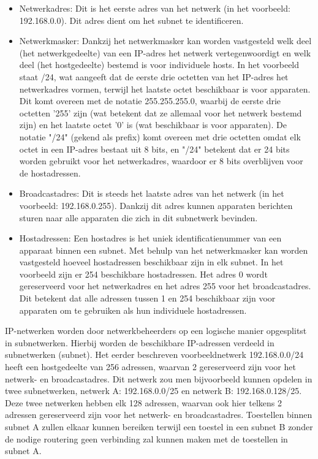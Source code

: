 \begin{itemize}
    \item Netwerkadres: Dit is het eerste adres van het netwerk (in het voorbeeld: 192.168.0.0). Dit adres dient om het subnet te identificeren.
    \item Netwerkmasker: Dankzij het netwerkmasker kan worden vastgesteld welk deel (het netwerkgedeelte) van een IP-adres het netwerk vertegenwoordigt en welk deel (het hostgedeelte) bestemd is voor individuele hosts. In het voorbeeld staat /24, wat aangeeft dat de eerste drie octetten van het IP-adres het netwerkadres vormen, terwijl het laatste octet beschikbaar is voor apparaten. Dit komt overeen met de notatie 255.255.255.0, waarbij de eerste drie octetten '255' zijn (wat betekent dat ze allemaal voor het netwerk bestemd zijn) en het laatste octet '0' is (wat beschikbaar is voor apparaten). De notatie "/24" (gekend als prefix) komt overeen met drie octetten omdat elk octet in een IP-adres bestaat uit 8 bits, en "/24" betekent dat er 24 bits worden gebruikt voor het netwerkadres, waardoor er 8 bits overblijven voor de hostadressen.      
    \item Broadcastadres: Dit is steeds het laatste adres van het netwerk (in het voorbeeld: 192.168.0.255). Dankzij dit adres kunnen apparaten berichten sturen naar alle apparaten die zich in dit subnetwerk bevinden.
    \item Hostadressen: Een hostadres is het uniek identificatienummer van een apparaat binnen een subnet. Met behulp van het netwerkmasker kan worden vastgesteld hoeveel hostadressen beschikbaar zijn in elk subnet. In het voorbeeld zijn er 254 beschikbare hostadressen. Het adres 0 wordt gereserveerd voor het netwerkadres en het adres 255 voor het broadcastadres. Dit betekent dat alle adressen tussen 1 en 254 beschikbaar zijn voor apparaten om te gebruiken als hun individuele hostadressen.
\end{itemize}


IP-netwerken worden door netwerkbeheerders op een logische manier opgesplitst in subnetwerken. Hierbij worden de beschikbare IP-adressen verdeeld in subnetwerken (subnet). Het eerder beschreven voorbeeldnetwerk 192.168.0.0/24 heeft een hostgedeelte van 256 adressen, waarvan 2 gereserveerd zijn voor het netwerk- en broadcastadres. Dit netwerk zou men bijvoorbeeld kunnen opdelen in twee subnetwerken, netwerk A: 192.168.0.0/25 en netwerk B: 192.168.0.128/25. Deze twee netwerken hebben elk 128 adressen, waarvan ook hier telkens 2 adressen gereserveerd zijn voor het netwerk- en broadcastadres.
Toestellen binnen subnet A zullen elkaar kunnen bereiken terwijl een toestel in een subnet B zonder de nodige routering geen verbinding zal kunnen maken met de toestellen in subnet A.

